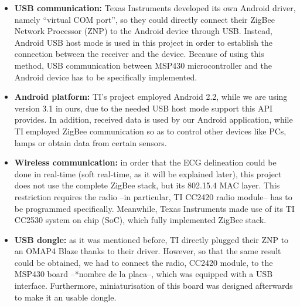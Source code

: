 \begin{itemize}
\begin{itemize}
					\item \textbf{USB communication:} Texas Instruments developed its own Android driver, namely
						``virtual COM port'', so they could directly connect their ZigBee Network Processor (ZNP)
						to the Android device through USB. Instead, Android USB host mode is used in this project
						in order to establish the connection between the receiver and the device. Because of using
						this method, USB communication between MSP430 microcontroller and the Android device has
						to be specifically implemented.
					\item \textbf{Android platform:} TI's project employed Android 2.2, while we are using version
						3.1 in ours, due to the needed USB host mode support this API provides. In addition, received
						data is used by our Android application, while TI employed ZigBee communication so as to
						control other devices like PCs, lamps or obtain data from certain sensors.
					\item \textbf{Wireless communication:} in order that the ECG delineation could be done in real-time
						(soft real-time, as it will be explained later), this project does not use the complete
						ZigBee stack, but its 802.15.4 MAC layer. This restriction requires the radio --in particular,
						TI CC2420 radio module-- has to be programmed specifically. Meanwhile, Texas Instruments made
						use of its TI CC2530 system on chip (SoC), which fully implemented ZigBee stack.
					\item \textbf{USB dongle:} as it was mentioned before, TI directly plugged their ZNP to an OMAP4
						Blaze thanks to their driver. However, so that the same result could be obtained, we had to
						connect the radio, CC2420 module, to the MSP430 board --*nombre de la placa--, which was equipped
						with a USB interface. Furthermore, miniaturisation of this board was designed afterwards to
						make it an usable dongle.
				\end{itemize}
		\end{itemize}
	
		
	
